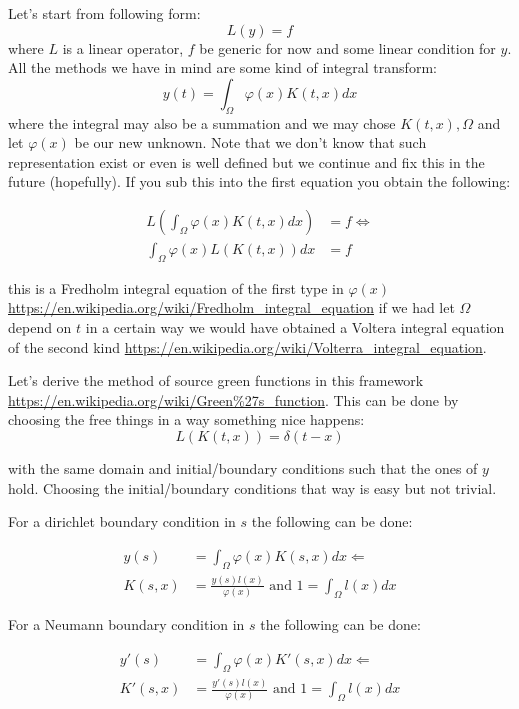 
Let's start from following form:
$$
    L(y)= f
$$
where $L$ is a linear operator, $f$ be generic for now and some linear condition
for $y$. All the methods we have in mind are some kind of integral transform:
$$
    y(t) = \int_{\Omega} \varphi(x) K(t,x)dx
$$
where the integral may also be a summation and we may chose $K(t,x), \Omega$ and let $\varphi(x)$ be our new unknown. Note that we don't know that such representation exist or even is well defined but we continue and fix this in the future (hopefully). If you sub this into the first equation you obtain the following:

\begin{align*}
    L \left(\int_{\Omega} \varphi(x) K(t,x)dx \right) & = f \Leftrightarrow \\
    \int_{\Omega} \varphi(x) L \left(K(t,x) \right)dx & = f
\end{align*}

this is a Fredholm integral equation of the first type in $\varphi(x)$
\url{https://en.wikipedia.org/wiki/Fredholm_integral_equation}
if we had
let $\Omega$ depend on $t$ in a certain way we would have obtained a Voltera integral
equation of the second kind
\url{https://en.wikipedia.org/wiki/Volterra_integral_equation}.

Let's derive the method of source green functions in this framework
\url{https://en.wikipedia.org/wiki/Green%27s_function}. 
This can be done by choosing the free things in a way something nice happens:
$$
    L \left(K(t,x) \right) = \delta(t-x)
$$

with the same  domain and initial/boundary conditions such that the ones of $y$ hold.
Choosing the initial/boundary conditions that way is easy but not trivial.

For a dirichlet boundary condition in $s$ the following can be done:

\begin{align*}
    y(s)   & = \int_{\Omega} \varphi(x) K(s,x)dx \Leftarrow                      \\
    K(s,x) & = \frac{y(s) l(x)}{\varphi(x)} \text{ and } 1 = \int_{\Omega}l(x)dx
\end{align*}

For a Neumann boundary condition in $s$ the following can be done:

\begin{align*}
    y'(s)   & = \int_{\Omega} \varphi(x) K'(s,x)dx \Leftarrow                      \\
    K'(s,x) & = \frac{y'(s) l(x)}{\varphi(x)} \text{ and } 1 = \int_{\Omega}l(x)dx
\end{align*}

